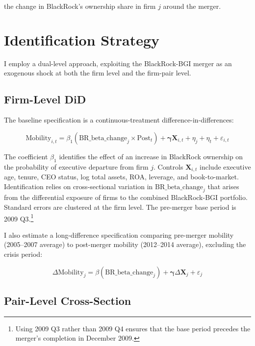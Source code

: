 \documentclass[11pt,a4paper]{article}
\begin{document}
the change in BlackRock's ownership share in firm $j$ around the merger.

\newpage

\section{Identification Strategy}
\label{sec:strategy}

I employ a dual-level approach, exploiting the BlackRock-BGI merger as an exogenous shock at both the firm level and the firm-pair level.

\subsection{Firm-Level DiD}

The baseline specification is a continuous-treatment difference-in-differences:

\begin{equation}\label{eq:firm_did}
\text{Mobility}_{i,t} = \beta_1 (\text{BR\_beta\_change}_j \times \text{Post}_t) + \boldsymbol{\gamma} \mathbf{X}_{i,t} + \eta_j + \eta_t + \varepsilon_{i,t}
\end{equation}

The coefficient $\beta_1$ identifies the effect of an increase in BlackRock ownership on the probability of executive departure from firm $j$. Controls $\mathbf{X}_{i,t}$ include executive age, tenure, CEO status, log total assets, ROA, leverage, and book-to-market. Identification relies on cross-sectional variation in $\text{BR\_beta\_change}_j$ that arises from the differential exposure of firms to the combined BlackRock-BGI portfolio. Standard errors are clustered at the firm level. The pre-merger base period is 2009 Q3.\footnote{Using 2009 Q3 rather than 2009 Q4 ensures that the base period precedes the merger's completion in December 2009.}

I also estimate a long-difference specification comparing pre-merger mobility (2005--2007 average) to post-merger mobility (2012--2014 average), excluding the crisis period:

\begin{equation}
\Delta \text{Mobility}_{j} = \beta (\text{BR\_beta\_change}_j) + \boldsymbol{\gamma} \Delta \mathbf{X}_{j} + \varepsilon_{j}
\end{equation}

\subsection{Pair-Level Cross-Section}
\end{document}
